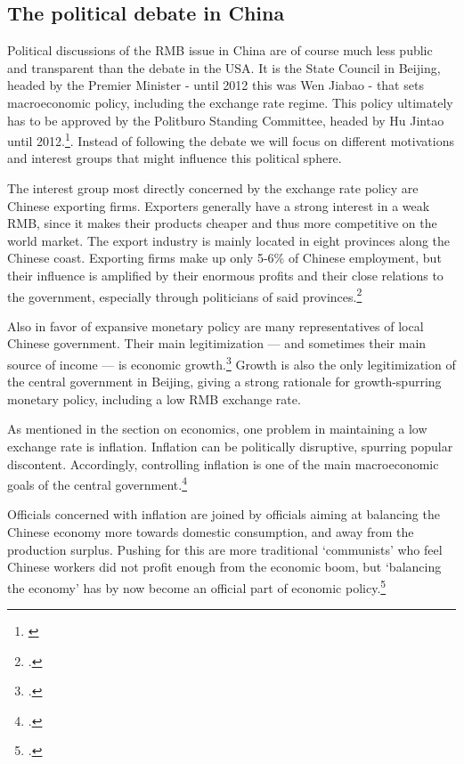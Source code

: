 \subsection{The political debate in China}

Political discussions of the RMB issue in China are of course much less 
public and transparent than the debate in the USA. It is the State 
Council in Beijing, headed by the Premier Minister - until 2012 this was 
Wen Jiabao - that sets macroeconomic policy, including the exchange rate 
regime.  This policy ultimately has to be approved by the Politburo 
Standing Committee, headed by Hu Jintao until 
2012.\footnote{\cite{naughton2008}}. Instead of following the debate we 
will focus on different motivations and interest groups that might 
influence this political sphere.

The interest group most directly concerned by the exchange rate policy 
are Chinese exporting firms. Exporters generally have a strong interest 
in a weak RMB, since it makes their products cheaper and thus more 
competitive on the world market. The export industry is mainly located 
in eight provinces along the Chinese coast. Exporting firms make up only 
5-6\% of Chinese employment, but their influence is amplified by their 
enormous profits and their close relations to the government, especially 
through politicians of said provinces.\footnote{\cite[p.  
202]{Breslin2010}.} 

Also in favor of expansive monetary policy are many representatives of 
local Chinese government. Their main legitimization --- and sometimes 
their main source of income --- is economic growth.\footnote{\cite[pp.  
19]{Levy2011}.} Growth is also the only legitimization of the central 
government in Beijing, giving a strong rationale for growth-spurring 
monetary policy, including a low RMB exchange rate.

As mentioned in the section on economics, one problem in maintaining a 
low exchange rate is inflation. Inflation can be politically disruptive, 
spurring popular discontent. Accordingly, controlling inflation is one 
of the main macroeconomic goals of the central 
government.\footnote{\cite{Naugthon2011}.}

Officials concerned with inflation are joined by officials aiming at 
balancing the Chinese economy more towards domestic consumption, and 
away from the production surplus. Pushing for this are more traditional 
`communists' who feel Chinese workers did not profit enough from the 
economic boom, but `balancing the economy' has by now become an official 
part of economic policy.\footnote{\cite{Xinhua2011}.}

